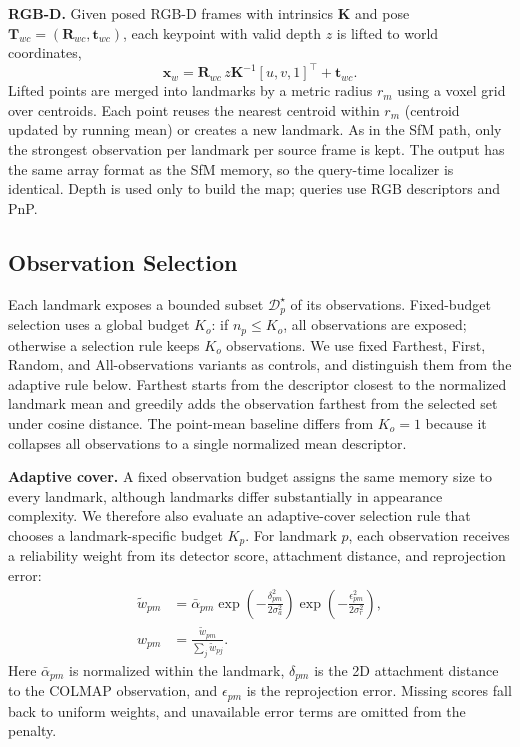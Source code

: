 \documentclass[letterpaper,10 pt,conference]{ieeeconf}
\begin{document}
\textbf{RGB-D.} Given posed RGB-D frames with intrinsics $\mathbf{K}$ and pose $\mathbf{T}_{wc}=(\mathbf{R}_{wc},\mathbf{t}_{wc})$, each keypoint with valid depth $z$ is lifted to world coordinates,
\begin{equation}
    \mathbf{x}_w=\mathbf{R}_{wc}\,z\mathbf{K}^{-1}[u,v,1]^\top+\mathbf{t}_{wc}.
    \label{eq:rgbd-backproject}
\end{equation}
 Lifted points are merged into landmarks by a metric radius $r_m$ using a voxel grid over centroids. Each point reuses the nearest centroid within $r_m$ (centroid updated by running mean) or creates a new landmark. As in the SfM path, only the strongest observation per landmark per source frame is kept. The output has the same array format as the SfM memory, so the query-time localizer is identical. Depth is used only to build the map; queries use RGB descriptors and PnP.

\subsection{Observation Selection}
Each landmark exposes a bounded subset $\mathcal{D}^{\star}_p$ of its observations. Fixed-budget selection uses a global budget $K_o$: if $n_p\le K_o$, all observations are exposed; otherwise a selection rule keeps $K_o$ observations. We use fixed Farthest, First, Random, and All-observations variants as controls, and distinguish them from the adaptive rule below. Farthest starts from the descriptor closest to the normalized landmark mean and greedily adds the observation farthest from the selected set under cosine distance. The point-mean baseline differs from $K_o=1$ because it collapses all observations to a single normalized mean descriptor.

\textbf{Adaptive cover.}
A fixed observation budget assigns the same memory size to every landmark, although landmarks differ substantially in appearance complexity. We therefore also evaluate an adaptive-cover selection rule that chooses a landmark-specific budget $K_p$. For landmark $p$, each observation receives a reliability weight from its detector score, attachment distance, and reprojection error:
\[
\begin{aligned}
\tilde{w}_{pm}
&=
\bar{\alpha}_{pm}
\exp\!\left(-\frac{\delta_{pm}^{2}}{2\sigma_a^2}\right)
\exp\!\left(-\frac{\epsilon_{pm}^{2}}{2\sigma_r^2}\right),\\
w_{pm}
&=
\frac{\tilde{w}_{pm}}{\sum_j\tilde{w}_{pj}} .
\end{aligned}
\]
Here $\bar{\alpha}_{pm}$ is normalized within the landmark, $\delta_{pm}$ is the 2D attachment distance to the COLMAP observation, and $\epsilon_{pm}$ is the reprojection error. Missing scores fall back to uniform weights, and unavailable error terms are omitted from the penalty.
\end{document}
